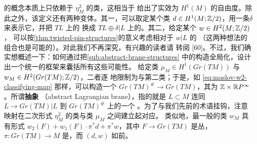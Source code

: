 \begin{remark}\label{thm:brane-homotopy-remark}
\trLagrange\trBrane{}的概念本质上只依赖于 $\eta_M^2$ 的\trHomotopy{}类，这相当于
给出了实效为 $H^1(M)$ 的自由度。除此之外，该定义还有两种变体。其一，可以取定某个类
$d\in H^1(M;\mathbb{Z}/2)$，用一条\trRealLineBundle{}$\delta$ 来表示它，并把 $TL$ 上的%
\trPinStructure{}换成 $TL\oplus\delta|L$ 上的。其二，给定某个 $w\in H^2(M;\mathbb{Z}/2)$，
可以按\cref{thm:twisted-pin-structures}的意义考虑相对于 $w|L$ 的\trTwisted
\trPinStructure（这两种想法的组合也是可能的）。对此我们不再深究，有兴趣的读者请
转阅 [60]。不过，我们确实想概述一下：如何通过把\cref{sub:abstract-brane-structures}
中的构造全局化，设计出一个统一的框架来囊括所有这些可能性。
给定\trCohomology{}类 $\mu_M\in H^1(Gr(TM))$ 与 $w_M\in H^2(Gr(TM);\mathbb{Z}/2)$，二者逐%
\trFiber{}地限制为\trMaslovClass{}与第二\trStiefelWhitney{}类；于是，如
\eqref{eq:maslov-w2-classifying-map} 那样，可以构造一个\trFibration{}
$Gr(TM)^{\#}\to Gr(TM)$，其\trFiber{}为 $\mathbb{Z}\times\mathbb{R}P^\infty$。所谓\textbf{抽象%
\trLagrange\trBrane}（abstract Lagrangian brane），指的就是\trLagrange\trSubmanifold{}
$L\subset M$ 连同\trCanonical\trSection{}$L\to Gr(TM)|L$ 到 $Gr(TM)^{\#}$ 上的一个%
\trLift。为了与我们先前的术语挂钩，注意\trSquaredPhase{}映射在二次\trVolume{}形式
$\eta_M^2$ 的\trHomotopy{}类与\trCohomology{}类 $\mu_M$ 之间建立起\trBijective{}对应。
类似地，最一般的类 $w_M$ 具有形式 $w_2(F)+w_1(F)\cdot\pi^*d+\pi^*w$，其中
$F\to Gr(TM)$ 是\trUniversal{}丛，$\pi\colon Gr(TM)\to M$ 是\trProjection，而
$(d,w)$ 如前。
\end{remark}
